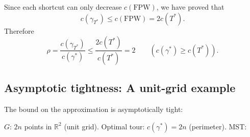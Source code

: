 Since each shortcut can only decrease $c(\mathrm{FPW})$, we have proved that
\[c(\gamma_{T^*})\leq c(\mathrm{FPW})=2c(T^*).\]
Therefore
\[\rho=\frac{c(\gamma_{T^*})}{c(\gamma^*)}\leq\frac{2c(T^*)}{c(T^*)}=2\qquad(c(\gamma^*)\geq c(T^*)).\]
\subsection{Asymptotic tightness: A unit-grid example}
The bound on the approximation is asymptotically tight:

$G$: $2n$ points in $\mathbb R^2$ (unit grid).
Optimal tour: $c(\gamma^*)=2n$ (perimeter).
MST:
